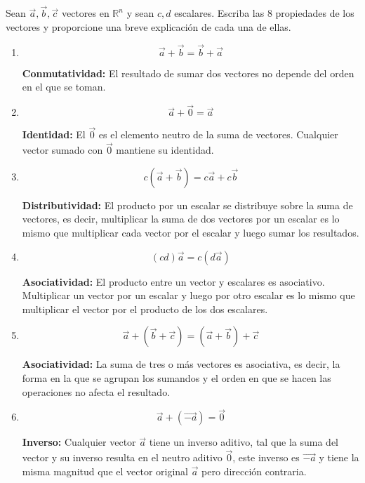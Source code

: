\documentclass[12pt]{article}
\begin{document}
\section{}

Sean $\vec{a} , \vec{b} , \vec{c}$ vectores en $\mathbb{R}^n$ y sean $c,d$ escalares. Escriba las 8 propiedades de los vectores y proporcione una breve explicación de cada una de ellas.

\begin{enumerate}[format=\textbf]

\item $$\vec{a}+\vec{b} = \vec{b}+\vec{a}$$
  
  \textbf{Conmutatividad:} El resultado de sumar dos vectores no depende del orden en el que se toman.

\item $$\vec{a}+\vec{0} = \vec{a}$$
  
  \textbf{Identidad:} El $\vec{0}$ es el elemento neutro de la suma de vectores. Cualquier vector sumado con $\vec{0}$ mantiene su identidad. 

\item $$c(\vec{a}+\vec{b}) = c\vec{a}+c\vec{b}$$
  
   \textbf{Distributividad:} El producto por un escalar se distribuye sobre la suma de vectores, es decir,  multiplicar la suma de dos vectores por un escalar es lo mismo que multiplicar cada vector por el escalar y luego sumar los resultados.

 \item $$(cd)\vec{a} = c(d\vec{a})$$
   
   \textbf{Asociatividad:} El producto entre un vector y escalares es asociativo. Multiplicar un vector por un escalar y luego por otro escalar es lo mismo que multiplicar el vector por el producto de los dos escalares.  

 \item $$\vec{a}+(\vec{b}+\vec{c}) = (\vec{a}+\vec{b})+\vec{c}$$
   
   \textbf{Asociatividad:} La suma de tres o más vectores es asociativa, es decir, la forma en la que se agrupan los sumandos  y el orden en que se hacen las operaciones no afecta el resultado.

 \item $$\vec{a}+(\vec{-a}) = \vec{0}$$
   
   \textbf{Inverso:} Cualquier vector $\vec{a}$ tiene un inverso aditivo, tal que la suma del vector y su inverso resulta en el neutro aditivo $\vec{0}$, este inverso es $\vec{-a}$ y tiene la misma magnitud que el vector original $\vec{a}$ pero dirección contraria.
   

\end{enumerate}
\end{document}
